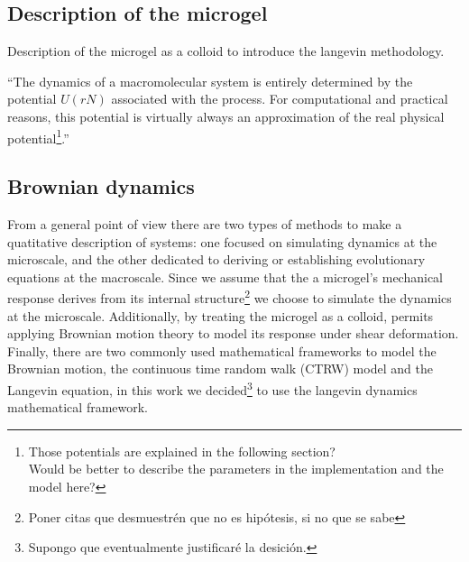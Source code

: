\documentclass[../../main-notes.tex]{subfiles}
\begin{document}
\subsection{Description of the microgel}
Description of the microgel as a colloid to introduce the langevin methodology.

“The dynamics of a macromolecular system is entirely determined by the potential $U(rN)$ associated with the process. For computational and practical reasons, this potential is virtually always an approximation of the real physical potential\footnote{Those potentials are explained in the following section?\\ Would be better to describe the parameters in the implementation and the model here?}.”\citep{paquetMolecularDynamicsMonte2015}


\subsection{Brownian dynamics}

From a general point of view there are two types of methods to make a quatitative description of systems: one focused on simulating dynamics at the microscale, and the other dedicated to deriving or establishing evolutionary equations at the macroscale\citep{wangMultiscaleModelingSimulation2025}.
Since we assume that the a microgel's mechanical response derives from its internal structure\footnote{Poner citas que desmuestrén que no es hipótesis, si no que se sabe} we choose to simulate the dynamics at the microscale.
Additionally, by treating the microgel as a colloid, permits applying Brownian motion theory to model its response under shear deformation. 
Finally, there are two commonly used mathematical frameworks to model the Brownian motion, the continuous time random walk (CTRW) model and the Langevin equation\citep{wangMultiscaleModelingSimulation2025}, in this work we decided\footnote{Supongo que eventualmente justificaré la desición.} to use the langevin dynamics mathematical framework.
\end{document}
